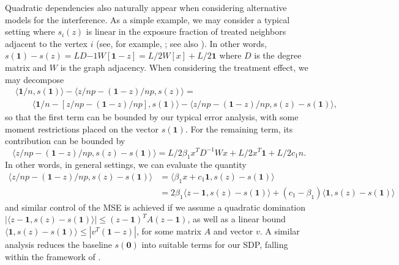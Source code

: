 \documentclass[12pt]{article}
\theoremstyle{definition}
\numberwithin{equation}{section}
\numberwithin{figure}{section}
\numberwithin{equation}{section}
\numberwithin{figure}{section}
\begin{document}
\begin{example}\label{exp: quad interference}
Quadratic dependencies also naturally appear when considering alternative models for the interference. As a simple example, we may consider a typical setting where $s_i(z)$ is linear in the exposure  fraction of treated neighbors adjacent to the vertex $i$ (see, for example, \citet{thiyageswaran2024data}; see also ). In other words, $s(\mathbf{1}) - s(z) = L D{-1}W [\mathbf{1} - z] = L/2W[x] + L/2 \mathbf{1}$ where $D$ is the degree matrix and $W$ is the graph adjacency. When considering the treatment effect, we may decompose
\begin{align*}
&\langle \mathbf{1}/n, s(\mathbf{1})\rangle - \langle z/np - (\mathbf{1} - z)/np, s(z)\rangle = \\
&\quad\quad \langle \mathbf{1}/n - [z/np - (\mathbf{1} - z)/np], s(\mathbf{1})\rangle - \langle z/np - (\mathbf{1} - z)/np, s(z) - s(\mathbf{1})\rangle,
\end{align*}
so that the first term can be bounded by our typical error analysis, with some moment restrictions placed on the vector $s(\mathbf{1})$. For the remaining term, its contribution can be bounded by
\[
\langle z/np - (\mathbf{1} - z)/np, s(z) - s(\mathbf{1})\rangle   = L/2\beta_1 x^T D^{-1}W x + L/2 x^T \mathbf{1} + L/2 c_1 n.
\]
In other words, in general settings, we can evaluate the quantity
\begin{align*}
\langle z/np - (\mathbf{1} - z)/np, s(z) - s(\mathbf{1})\rangle &= \langle \beta_1 x + c_1 \mathbf{1}, s(z) - s(\mathbf{1})\rangle\\
&= 2\beta_1\langle z-\mathbf{1}, s(z) - s(\mathbf{1})\rangle + (c_1 - \beta_1)\langle \mathbf{1}, s(z) - s(\mathbf{1})\rangle
\end{align*}
and similar control of the MSE is achieved if we assume a quadratic domination $|\langle z-\mathbf{1}, s(z) - s(\mathbf{1})\rangle| \leq (z-\mathbf{1})^TA(z-\mathbf{1})$, as well as a linear bound $\langle \mathbf{1}, s(z) - s(\mathbf{1})\rangle \leq |v^T (\mathbf{1} - z)|$, for some matrix $A$ and vector $v$. A similar analysis reduces the baseline $s(\mathbf{0})$ into suitable terms for our SDP, falling within the framework of .
\end{example}
\end{document}
